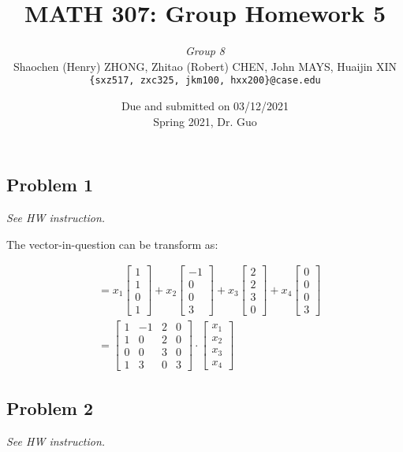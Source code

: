 \documentclass[11pt]{article}
\newcommand{\ilc}{\texttt}
\providecommand{\qbm}[1]{\begin{bmatrix} #1 \end{bmatrix}}
\begin{document}
\title{\textbf{MATH 307: Group Homework 5}}


\author{\textit{Group 8}\\
Shaochen (Henry) ZHONG, Zhitao (Robert) CHEN, John MAYS, Huaijin XIN\\ \ilc{\{sxz517, zxc325, jkm100, hxx200\}@case.edu}}

\date{Due and submitted on 03/12/2021 \\ Spring 2021, Dr. Guo}
\maketitle



\subsection*{Problem 1}
\textit{See HW instruction.}\newline

The vector-in-question can be transform as:

\begin{align*}
    &= x_1 \qbm{1 \\ 1 \\ 0 \\ 1} + x_2 \qbm{-1 \\ 0 \\ 0 \\ 3} + x_3 \qbm{2 \\ 2 \\ 3 \\0} + x_4 \qbm{0 \\ 0 \\ 0 \\  3} \\
    &= \qbm{1 & -1 & 2 & 0 \\
            1 & 0 & 2 & 0 \\
            0 & 0 & 3 & 0 \\
            1 & 3 & 0 & 3} \cdot \qbm{x_1 \\ x_2 \\ x_3 \\ x_4 }
\end{align*}

\subsection*{Problem 2}
\textit{See HW instruction.}\newline
\end{document}
